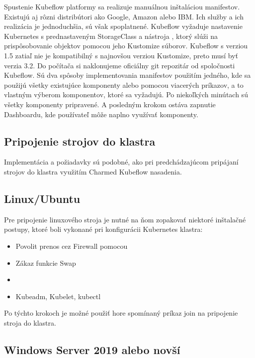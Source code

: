 Spustenie Kubeflow platformy sa realizuje manuálnou inštaláciou manifestov. Existujú aj rôzni distribútori ako Google, Amazon alebo IBM. Ich služby a ich realizácia je jednoduchšia, sú však spoplatnené. Kubeflow vyžaduje nastavenie Kubernetes s prednastaveným StorageClass a nástroja , ktorý slúži na prispôsobovanie objektov pomocou jeho Kustomize súborov. Kubeflow s verziou 1.5 zatiaľ nie je kompatibilný s najnovšou verziou Kustomize, preto musí byť verzia 3.2. Do počítača si naklonujeme oficiálny git repozitár od spoločnosti Kubeflow. Sú dva spôsoby implementovania manifestov použitím jedného, kde sa použijú všetky existujúce komponenty alebo pomocou viacerých príkazov, a to vlastným výberom komponentov, ktoré sa vyžadujú. Po niekoľkých minútach sú všetky komponenty pripravené. A posledným krokom ostáva zapnutie Dashboardu, kde používateľ môže naplno využívať komponenty.

\subsection{Pripojenie strojov do klastra}

Implementácia a požiadavky sú podobné, ako pri predchádzajúcom pripájaní strojov do klastra využitím Charmed Kubeflow nasadenia.

\subsection*{Linux/Ubuntu}

Pre pripojenie linuxového stroja je nutné na ňom zopakovať niektoré inštalačné postupy, ktoré boli vykonané pri konfigurácii Kubernetes klastra:

\begin{itemize}
    \item Povolit prenos cez Firewall pomocou 
    \item Zákaz funkcie Swap
    \item {}
    \item Kubeadm, Kubelet, kubectl
\end{itemize}

Po týchto krokoch je možné použiť hore spomínaný príkaz join na pripojenie stroja do klastra.

\subsection*{Windows Server 2019 alebo novší}

